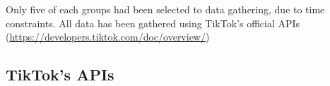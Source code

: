 Only five of each groups had been selected to data gathering, due to time constraints. All data has been gathered using TikTok's official APIs (\href{https://developers.tiktok.com/doc/overview/}{https://developers.tiktok.com/doc/overview/})

\subsection{TikTok's APIs}